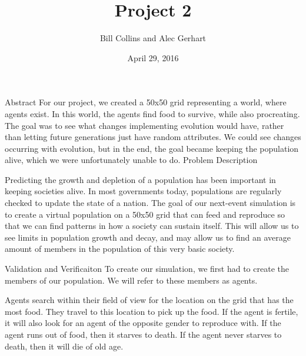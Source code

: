 \documentclass[11pt]{article}
\title{Project 2}
\author{Bill Collins and Alec Gerhart}
\date{April 29, 2016}
\begin{document}
\begin{multicols}{2}

\maketitle


\center 
Abstract
\flushleft
For our project, we created a 50x50 grid representing a world, where agents exist. In this world, the agents find food to survive, while also procreating. The goal was to see what changes implementing evolution would have, rather than letting future generations just have random attributes. We could see changes occurring with evolution, but in the end, the goal became keeping the population alive, which we were unfortunately unable to do.
\center 
Problem Description 
\flushleft

Predicting the growth and depletion of a population has been important in keeping societies alive. In most governments today, populations are regularly checked to update the state of a nation. The goal of our next-event simulation is to create a virtual population on a 50x50 grid that can feed and reproduce so that we can find patterns in how a society can sustain itself. This will allow us to see limits in population growth and decay, and may allow us to find an average amount of members in the population of this very basic society.


\center 
Validation and Verificaiton
\flushleft
To create our simulation, we first had to create the members of our population. We will refer to these members as agents.

Agents search within their field of view for the location on the grid that has the most food. They travel to this location to pick up the food. If the agent is fertile, it will also look for an agent of the opposite gender to reproduce with. If the agent runs out of food, then it starves to death. If the agent never starves to death, then it will die of old age. \newline


\end{multicols}
\end{document}
